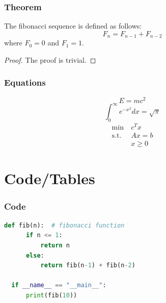 \documentclass{cls/simplebeamer}
\begin{document}
\begin{frame}
  \frametitle{Theorem}
  \begin{theorem}
    The fibonacci sequence is defined as follows:
    \begin{equation}
      F_n = F_{n-1} + F_{n-2}
    \end{equation}
    where $F_0 = 0$ and $F_1 = 1$.
  \end{theorem}
  \begin{proof}
    The proof is trivial.
  \end{proof}
\end{frame}

\begin{frame}
  \frametitle{Equations}
  
  \begin{equation}
    E = mc^2
  \end{equation}
  \begin{equation}
    \int_0^\infty e^{-x^2} dx = \sqrt{\pi}
  \end{equation}
  \vspace{12pt}
  \begin{equation}
    \begin{aligned}
      \min~ & c^T x \\
      \text{s.t. } & Ax = b\\
      & x \geq 0 
    \end{aligned}
  \end{equation}
\end{frame}

\section{Code/Tables}

\begin{frame}[fragile]
  \frametitle{Code}
  \begin{lstlisting}[language=Python]
  def fib(n):  # fibonacci function
      if n <= 1:
          return n
      else:
          return fib(n-1) + fib(n-2)

  if __name__ == "__main__":
      print(fib(10))
  \end{lstlisting}
\end{frame}
\end{document}
